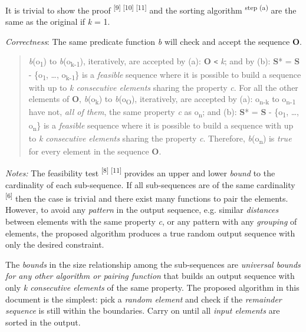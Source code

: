 \documentclass[12pt]{article}
\begin{document}
It is trivial to show the proof \textsuperscript{[9] [10] [11]} and the sorting algorithm 
\textsuperscript{step (a)} are the same as the original if \textit{k} = 1.

\textit{Correctness}: The same predicate function \textit{b} will check and accept 
the sequence \textbf{O}.

\begin{quote}
\textit{b}(o\textsubscript{1}) to \textit{b}(o\textsubscript{k-1}), iteratively, 
are accepted by (a): \textbar{}\textbf{O}\textbar{} \texttt{<} \textit{k}; and 
by (b): \textbf{S}* = \textbf{S} - \{o\textsubscript{1}, \ldots, o\textsubscript{k-1}\} 
is a \textit{feasible} sequence where it is possible to build a sequence with up 
to \textit{k consecutive elements} sharing the property \textit{c}. For all the 
other elements of \textbf{O}, \textit{b}(o\textsubscript{k}) to \textit{b}(o\textsubscript{\textbar{}O\textbar{}}), iteratively, are accepted by (a): o\textsubscript{n-k} to o\textsubscript{n-1} have not, \textit{all of them}, the same property \textit{c} as o\textsubscript{n}; 
and (b): \textbf{S}* = \textbf{S} - \{o\textsubscript{1}, \ldots, o\textsubscript{n}\} 
is a \textit{feasible} sequence where it is possible to build a sequence with up 
to \textit{k consecutive elements} sharing the property \textit{c}. Therefore,\textit{ 
b}(o\textsubscript{n}) is \textit{true} for every element in the sequence \textbf{O}.
\end{quote}

\textit{Notes:} The feasibility test \textsuperscript{[8] [11]} provides an upper and lower \textit{bound} to the cardinality of each sub-sequence. If all sub-sequences are of the same cardinality \textsuperscript{[6]} then the case is trivial and there exist many functions to pair the elements. However, to avoid any \textit{pattern} in the output sequence, e.g. similar \textit{distances} between elements with the same property \textit{c}, or any pattern with any \textit{grouping} of elements, the proposed algorithm produces a true random output sequence with only the desired constraint.

The \textit{bounds} in the size relationship among the sub-sequences are \textit{universal bounds for any other algorithm or pairing function} that builds an output sequence with only \textit{k consecutive elements} of the same property. The proposed algorithm in this document is the simplest: pick a \textit{random element} and check if the \textit{remainder sequence} is still within the boundaries. Carry on until all \textit{input elements} are sorted in the output.
\end{document}
